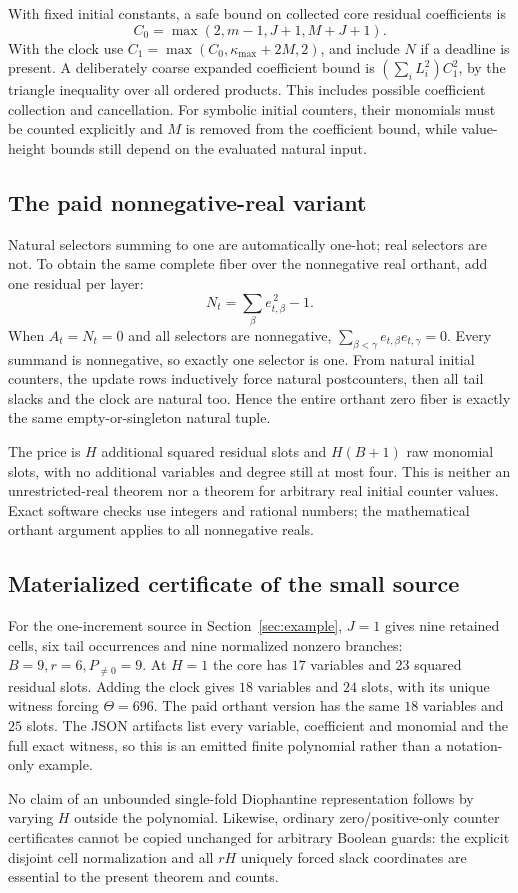 With fixed initial constants, a safe bound on collected core residual
coefficients is
\[
 C_0=\max(2,m-1,J+1,M+J+1).
\]
With the clock use $C_1=\max(C_0,\kappa_{\max}+2M,2)$, and include $N$ if a
deadline is present. A deliberately coarse expanded coefficient bound is
$(\sum_iL_i^2)C_1^2$, by the triangle inequality over all ordered products.
This includes possible coefficient collection and cancellation. For symbolic
initial counters, their monomials must be counted explicitly and $M$ is
removed from the coefficient bound, while value-height bounds still depend
on the evaluated natural input.

\subsection{The paid nonnegative-real variant}
Natural selectors summing to one are automatically one-hot; real selectors
are not. To obtain the same complete fiber over the nonnegative real orthant,
add one residual per layer:
\[
                 N_t=\sum_\beta e_{t,\beta}^{\,2}-1.                \tag{33}
\]
When $A_t=N_t=0$ and all selectors are nonnegative,
$\sum_{\beta<\gamma}e_{t,\beta}e_{t,\gamma}=0$. Every summand is nonnegative,
so exactly one selector is one. From natural initial counters, the update
rows inductively force natural postcounters, then all tail slacks and the
clock are natural too. Hence the entire orthant zero fiber is exactly the
same empty-or-singleton natural tuple.

The price is $H$ additional squared residual slots and $H(B+1)$ raw monomial
slots, with no additional variables and degree still at most four. This is
neither an unrestricted-real theorem nor a theorem for arbitrary real initial
counter values. Exact software checks use integers and rational numbers;
the mathematical orthant argument applies to all nonnegative reals.

\subsection{Materialized certificate of the small source}
For the one-increment source in Section~\ref{sec:example}, $J=1$ gives nine
retained cells, six tail occurrences and nine normalized nonzero branches:
$B=9,r=6,P_{\ne0}=9$. At $H=1$ the core has $17$ variables and $23$ squared
residual slots. Adding the clock gives $18$ variables and $24$ slots, with its
unique witness forcing $\Theta=696$. The paid orthant version has the same
$18$ variables and $25$ slots. The JSON artifacts list every variable,
coefficient and monomial and the full exact witness, so this is an emitted
finite polynomial rather than a notation-only example.

No claim of an unbounded single-fold Diophantine representation follows by
varying $H$ outside the polynomial. Likewise, ordinary zero/positive-only
counter certificates cannot be copied unchanged for arbitrary Boolean guards:
the explicit disjoint cell normalization and all $rH$ uniquely forced slack
coordinates are essential to the present theorem and counts.
